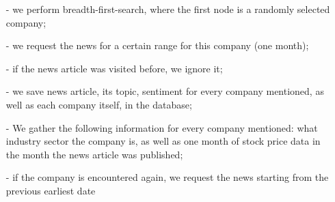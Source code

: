 \begin{itemize}
\item[-] we perform breadth-first-search, where the first node is a randomly selected company;
\item[-] we request the news for a certain range for this company (one month); 
\item[-] if the news article was visited before, we ignore it;
\item[-] we save news article, its topic, sentiment for every company mentioned, as well as each company itself, in the database;
\item[-] We gather the following information for every company mentioned: what industry sector the company is, as well as one month of stock price data in the month the news article was published;
\item[-] if the company is encountered again, we request the news starting from the previous earliest date
\end{itemize}
